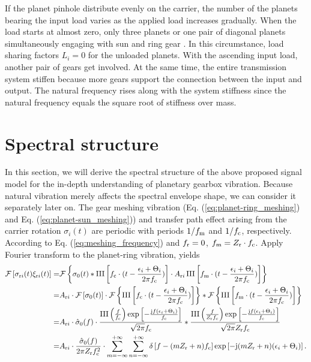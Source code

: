 \documentclass[a4paper,fleqn]{cas-sc}%
\begin{document}
\par If the planet pinhole distribute evenly on the carrier, the number of the planets bearing the input load varies as the applied load increases gradually. When the load starts at almost zero, only three planets or one pair of diagonal planets simultaneously engaging with sun and ring gear \cite{Ligata2009}. In this circumstance, load sharing factors $L_i=0$ for the unloaded planets. With the ascending input load, another pair of gears get involved. At the same time, the entire transmission system stiffen because more gears support the connection between the input and output. The natural frequency rises along with the system stiffness since the natural frequency equals the square root of stiffness over mass.
\section{Spectral structure \label{sec:spectral_structure}}
\par In this section, we will derive the spectral structure of the above proposed signal model for the in-depth understanding of planetary gearbox vibration. Because natural vibration merely affects the spectral envelope shape, we can consider it separately later on. The gear meshing vibration (Eq. (\ref{eq:planet-ring_meshing}) and Eq. (\ref{eq:planet-sun_meshing})) and transfer path effect arising from the carrier rotation $\sigma_{i}(t)$ are periodic with periods $1/f_{\rm m}$ and $1/f_{\rm c}$, respectively. According to Eq. (\ref{eq:meshing_frequency}) and $f_{\rm r}=0$, $f_{\rm m}=Z_{\rm r} \cdot f_{\rm c}$. Apply Fourier transform to the planet-ring vibration, yields
\begin{equation}
\begin{split}
    \mathcal{F}\left[ \sigma_{{\rm r}i}(t) \xi_{{\rm r}i}(t) \right]=&\mathcal{F}\left\{\sigma_0(t) \ast \operatorname{III}\left[f_{\rm c} \cdot (t - \frac{\epsilon_i+\Theta_i}{2 \pi f_{\rm c}})\right] \cdot A_{{\rm r}i}\operatorname{III}\left[f_{\rm m} \cdot (t-\frac{\epsilon_i+\Theta_i}{2 \pi f_{\rm c}})\right]\right\}\\
    =&A_{{\rm r}i} \cdot \mathcal{F}\left[\sigma_0(t)\right] \cdot \mathcal{F}\left\{\operatorname{III}\left[f_{\rm c} \cdot (t - \frac{\epsilon_i+\Theta_i}{2 \pi f_{\rm c}})\right] \right\}
    \ast \mathcal{F}\left\{ \operatorname{III}\left[f_{\rm m} \cdot (t-\frac{\epsilon_i+\Theta_i}{2 \pi f_{\rm c}})\right] \right\}\\
=&A_{{\rm r}i} \cdot \hat{\sigma}_0(f) \cdot \frac{\operatorname{III}\left(\frac{f}{f_{\rm c}}\right) \exp\left[-\frac{{\rm j} f (\epsilon_i+\Theta_i)}{f_{\rm c}}\right]}{\sqrt{2 \pi} f_{\rm c}} \ast \frac{\operatorname{III}\left(\frac{f}{ Z_{\rm r} f_{\rm c}}\right) \exp\left[-\frac{{\rm j} f (\epsilon_i+\Theta_i)}{ f_{\rm c}}\right]}{\sqrt{2 \pi } Z_{\rm r}f_{\rm c}}\\
=&A_{{\rm r}i} \cdot \frac{\hat{\sigma}_0(f)}{2 \pi Z_{\rm r} f_{\rm c}^{2}} \cdot \sum_{m=-\infty}^{+\infty} \sum_{n=-\infty}^{+\infty} \delta\left[f-(mZ_{\rm r}+n)f_{\rm c}\right] \exp\left[-{\rm j}(m Z_{\rm r}+n)(\epsilon_i+\Theta_i)\right].
\end{split}
\end{equation}
\end{document}
